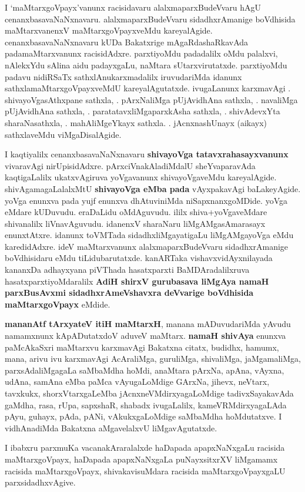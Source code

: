 I `maMtarxgoVpayx'vanunx racisidavaru alalxmaparxBudeVvaru hAgU cenanxbasavaNaNxnavaru. alalxmaparxBudeVvaru sidadhxrAmanige boVdhisida maMtarxvanenxV maMtarxgoVpayxveMdu kareyalAgide. cenanxbasavaNaNxnavaru kUDa Bakatxrige mAgaRdashaRkavAda padamaMtarx\-vanunx racisidAdxre. parxtiyoMdu padadalilx oMdu palalxvi, nAlekxYdu sAlina aidu padayxgaLu, naMtara sUtarxvirutatxde. parxtiyoMdu padavu nidiRSaTx sathxlAnukarxmadalilx iruvudariMda idanunx sathxlamaMtarxgoVpayxveMdU kareyalAgutatxde. ivugaLanunx karxmavAgi . shiva\-yoVgasAthxpane sathxla, . pArxNaliMga pUjAvidhAna sathxla, . navaliMga pUjAvidhAna sathxla, . paratatavxliMgaparxkAsha sathxla, . shivAdevxYta sharaNasathxla, . mahAliMgeYkayx sathxla. . jAcnxnashUnayx (aikayx) sathxlaveMdu viMgaDisalAgide.

I kaqtiyalilx cenanxbasavaNaNxnavaru \textbf{shivayoVga tatavxrahasayxvanunx} vivaravAgi nirUpisidAdxre. pArxciVnakAladiMdalU sheYvaparavAda kaqtigaLalilx ukatxvAgiruva yoVgavanunx shivayoVgaveMdu kareyalAgide. shivAgamagaLalalxMtU \textbf{shivayoVga eMba pada} vAyxpakavAgi baLakeyAgide. yoVga enunxva pada yujf enunxva dhAtuviniMda niSapxnanxgoMDide. yoVga eMdare kUDuvudu. eraDaLidu oMdAguvudu. ililx shiva+yoVgaveMdare shivanalilx liVnavAguvudu. idanenxV sharaNaru liMgAMgasAmarasayx enunxtAtxre. idanunx toVMTada sidadhxliMgayatigaLu liMgAMgayoVga eMdu karedidAdxre. ideV maMtarxvanunx alalxmaparxBudeVvaru sidadhxrAmanige boVdhisi\-daru eMdu tiLidubarutatxde. kanARTaka vishavxvidAyxnilayada kananxDa adhayxyana piVThada hasatxparxti BaMDAradalilxruva hasatxparxtiyoMdaralilx \textbf{AdiH shirxV gurubasava liMgAya namaH parxBusAvxmi sidadhxrAmeVshavxra deVvarige boVdhisida maMtarxgoVpayx} eMdide.

\textbf{mananAtf tArxyateV itiH maMtarxH}, manana mADuvudariMda yAvudu namamxnunx kApADutatxdoV aduveV maMtarx. \textbf{namaH shivAya} enunxva paMcAkaSxri maMtarxvu karxmavAgi Bakatxna citatx, budidhx, hamumx, mana, arivu ivu karxmavAgi AcAraliMga, guruliMga, shivaliMga, jaMgamaliMga, parxsAdaliMgagaLa saMbaMdha hoMdi, anaMtara pArxNa, apAna, vAyxna, udAna, samAna eMba paMca vAyu\-gaLoMdige GArxNa, jihevx, neVtarx, tavxkukx, shorxVtarxgaLeMba jAcnxneVMdirxyagaLoMdige tadivxSayakavAda gaMdha, rasa, rUpa, sapxshaR, shabadx ivugaLalilx, kameVRMdirxyagaLAda pAyu, guhayx, pAda, pANi, vAkukxgaLoMdige saMbaMdha hoMdutatxve. I vidhAnadiMda Bakatxna aMgavelalxvU liMgavAgutatxde.

I ibabxru parxmuKa vacanakAraralalxde haDapada apapxNaNxgaLu racisida maMtarxgoVpayx, haDapada apapxNaNxgaLa puNayxsitxrXV liMgamamx racisida maMtarxgoVpayx, shivakavisuMdara racisida maMtarxgoVpayxgaLU parxsidadhxvAgive.

